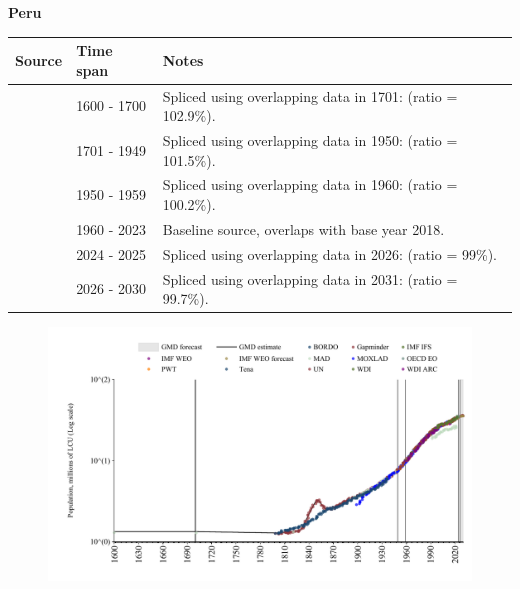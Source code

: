 \documentclass[12pt,a4paper,landscape]{article}
\begin{document}
\begin{adjustbox}{max totalsize={\paperwidth}{\paperheight},center}
\begin{minipage}[t][\textheight][t]{\textwidth}
\vspace*{0.5cm}
{}
\begin{center}
{\Large\bfseries Peru}
\end{center}
\vspace{0.5cm}
\begin{table}[H]
\centering
\small
\begin{tabular}{|l|l|l|}
\hline
\textbf{Source} & \textbf{Time span} & \textbf{Notes} \\
\hline
\rowcolor{white}\cite{MAD}& 1600 - 1700 &Spliced using overlapping data in 1701: (ratio = 102.9\%).\\
\rowcolor{lightgray}\cite{Gapminder}& 1701 - 1949 &Spliced using overlapping data in 1950: (ratio = 101.5\%).\\
\rowcolor{white}\cite{IMF_IFS}& 1950 - 1959 &Spliced using overlapping data in 1960: (ratio = 100.2\%).\\
\rowcolor{lightgray}\cite{WDI}& 1960 - 2023 &Baseline source, overlaps with base year 2018.\\
\rowcolor{white}\cite{OECD_EO}& 2024 - 2025 &Spliced using overlapping data in 2026: (ratio = 99\%).\\
\rowcolor{lightgray}\cite{Gapminder}& 2026 - 2030 &Spliced using overlapping data in 2031: (ratio = 99.7\%).\\
\hline
\end{tabular}
\end{table}
\begin{figure}[H]
\centering
\includegraphics[width=\textwidth,height=0.6\textheight,keepaspectratio]{graphs/PER_pop.pdf}
\end{figure}
\end{minipage}
\end{adjustbox}
\end{document}
